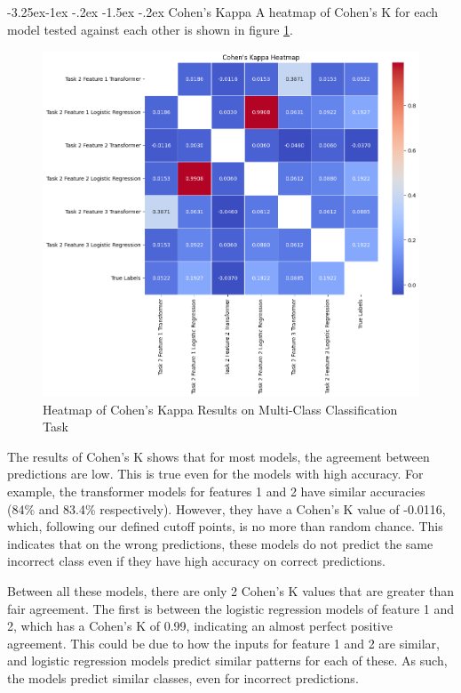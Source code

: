 \documentclass[10.7pt, onecolumn]{article}
\makeatletter
\renewcommand\subsubsection{\@startsection{subsubsection}{3}{\z@}%
	{-3.25ex\@plus -1ex \@minus -.2ex}%
    {-1.5ex \@plus -.2ex}%
    {\normalfont\itshape}}
\makeatother
\begin{document}
\subsubsection{Cohen's Kappa}
A heatmap of Cohen's K for each model tested against each other is shown in figure \ref{fig:cohenK}.
\begin{figure}[H]
  \centering
  \includegraphics[]{images/CohensK.png}
  \caption{Heatmap of Cohen's Kappa Results on Multi-Class Classification Task}
  \label{fig:cohenK}
\end{figure}

The results of Cohen's K shows that for most models, the agreement between predictions are low. This is true even for the models with high accuracy. For example, the transformer models for features 1 and 2 have similar accuracies (84\% and 83.4\% respectively). However, they have a Cohen's K value of -0.0116, which, following our defined cutoff points, is no more than random chance. This indicates that on the wrong predictions, these models do not predict the same incorrect class even if they have high accuracy on correct predictions.

Between all these models, there are only 2 Cohen's K values that are greater than fair agreement. The first is between the logistic regression models of feature 1 and 2, which has a Cohen's K of 0.99, indicating an almost perfect positive agreement. This could be due to how the inputs for feature 1 and 2 are similar, and logistic regression models predict similar patterns for each of these. As such, the models predict similar classes, even for incorrect predictions.
\end{document}
